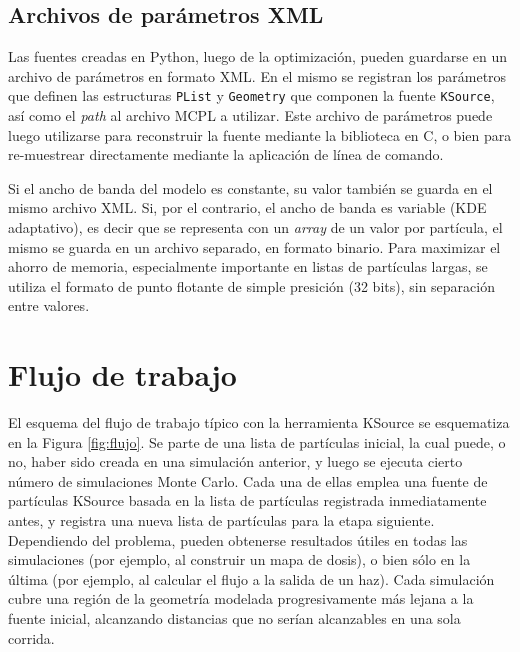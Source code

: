 \subsection{Archivos de parámetros XML}

Las fuentes creadas en Python, luego de la optimización, pueden guardarse en un archivo de parámetros en formato XML. En el mismo se registran los parámetros que definen las estructuras \verb|PList| y \verb|Geometry| que componen la fuente \verb|KSource|, así como el \emph{path} al archivo MCPL a utilizar. Este archivo de parámetros puede luego utilizarse para reconstruir la fuente mediante la biblioteca en C, o bien para re-muestrear directamente mediante la aplicación de línea de comando.

Si el ancho de banda del modelo es constante, su valor también se guarda en el mismo archivo XML. Si, por el contrario, el ancho de banda es variable (KDE adaptativo), es decir que se representa con un \emph{array} de un valor por partícula, el mismo se guarda en un archivo separado, en formato binario. Para maximizar el ahorro de memoria, especialmente importante en listas de partículas largas, se utiliza el formato de punto flotante de simple presición (32 bits), sin separación entre valores.


\section{Flujo de trabajo}
\label{sec:FT}

El esquema del flujo de trabajo típico con la herramienta KSource se esquematiza en la Figura \ref{fig:flujo}. Se parte de una lista de partículas inicial, la cual puede, o no, haber sido creada en una simulación anterior, y luego se ejecuta cierto número de simulaciones Monte Carlo. Cada una de ellas emplea una fuente de partículas KSource basada en la lista de partículas registrada inmediatamente antes, y registra una nueva lista de partículas para la etapa siguiente. Dependiendo del problema, pueden obtenerse resultados útiles en todas las simulaciones (por ejemplo, al construir un mapa de dosis), o bien sólo en la última (por ejemplo, al calcular el flujo a la salida de un haz). Cada simulación cubre una región de la geometría modelada progresivamente más lejana a la fuente inicial, alcanzando distancias que no serían alcanzables en una sola corrida.

